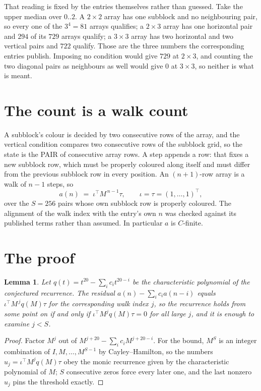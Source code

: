 \documentclass[11pt,a4paper]{article}
\theoremstyle{plain}
\newtheorem{lemma}[theorem]{Lemma}
\theoremstyle{definition}
\begin{document}
That reading is fixed by the entries themselves rather than guessed. Take the upper median
over $0..2$. A $2\times2$ array has one subblock and no neighbouring pair, so every one of the
$3^4=81$ arrays qualifies; a $2\times3$ array has one horizontal pair and $294$ of its $729$
arrays qualify; a $3\times3$ array has two horizontal and two vertical pairs and $722$
qualify. Those are the three numbers the corresponding entries publish. Imposing no condition
would give $729$ at $2\times3$, and counting the two diagonal pairs as neighbours as well
would give $0$ at $3\times3$, so neither is what is meant.

\section{The count is a walk count}

A subblock's colour is decided by two consecutive rows of the array, and
the vertical condition compares two consecutive rows of the subblock grid, so the state is the
PAIR of consecutive array rows. A step appends a row: that fixes a new subblock row, which
must be properly coloured along itself and must differ from the previous subblock row in every
position. An $(n+1)$-row array is a walk of $n-1$ steps, so
\[
a(n)\;=\;\iota^{\!\top}M^{\,n-1}\tau,\qquad\iota=\tau=(1,\dots,1)^{\!\top},
\]
over the $S=256$ pairs whose own subblock row is properly coloured.
The alignment of the walk index with the entry's own $n$ was checked against its published
terms rather than assumed. In particular $a$ is $C$-finite.

\section{The proof}

\begin{lemma}\label{lem:crit}
Let $q(t)=t^{20}-\sum_i c_it^{20-i}$ be the characteristic polynomial of the
conjectured recurrence. The residual $a(n)-\sum_ic_ia(n-i)$ equals
$\iota^{\!\top}M^{\,j}q(M)\tau$ for the corresponding walk index $j$, so the recurrence
holds from some point on if and only if $\iota^{\!\top}M^{j}q(M)\tau=0$ for all large $j$,
and it is enough to examine $j<S$.
\end{lemma}

\begin{proof}
Factor $M^{j}$ out of $M^{j+20}-\sum_ic_iM^{j+20-i}$. For the bound, $M^{S}$
is an integer combination of $I,M,\dots,M^{S-1}$ by Cayley--Hamilton, so the numbers
$u_j=\iota^{\!\top}M^{j}q(M)\tau$ obey the monic recurrence given by the characteristic
polynomial of $M$; $S$ consecutive zeros force every later one, and the last nonzero $u_j$
pins the threshold exactly.
\end{proof}
\end{document}
